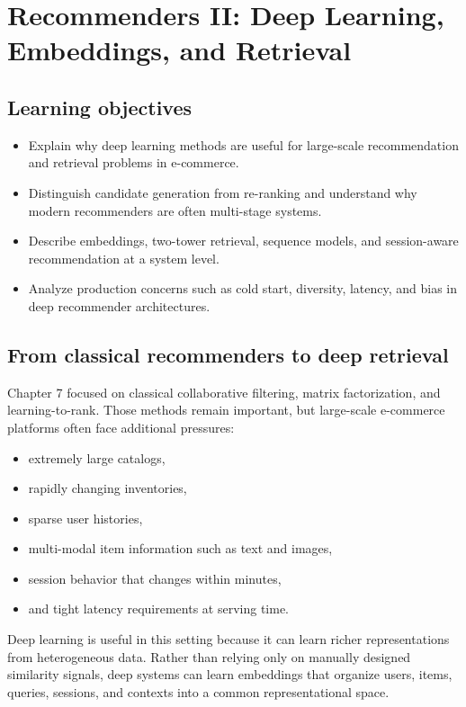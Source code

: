 \chapter[Recommenders II: Deep Models]{Recommenders II: Deep Learning, Embeddings, and Retrieval}

\section{Learning objectives}
\begin{itemize}
  \item Explain why deep learning methods are useful for large-scale recommendation and retrieval problems in e-commerce.
  \item Distinguish candidate generation from re-ranking and understand why modern recommenders are often multi-stage systems.
  \item Describe embeddings, two-tower retrieval, sequence models, and session-aware recommendation at a system level.
  \item Analyze production concerns such as cold start, diversity, latency, and bias in deep recommender architectures.
\end{itemize}

\section{From classical recommenders to deep retrieval}
Chapter 7 focused on classical collaborative filtering, matrix factorization, and learning-to-rank.
Those methods remain important, but large-scale e-commerce platforms often face additional pressures:
\begin{itemize}
  \item extremely large catalogs,
  \item rapidly changing inventories,
  \item sparse user histories,
  \item multi-modal item information such as text and images,
  \item session behavior that changes within minutes,
  \item and tight latency requirements at serving time.
\end{itemize}

Deep learning is useful in this setting because it can learn richer representations from heterogeneous data.
Rather than relying only on manually designed similarity signals, deep systems can learn embeddings that organize users, items, queries, sessions, and contexts into a common representational space.

